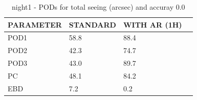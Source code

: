 \begin{table}[p!]
\begin{center}
\begin{tabular}{|l|l|l|l|}
\hline
\multicolumn{1}{|c|}{\cellcolor[HTML]{C0C0C0}\textbf{PARAMETER}} & \multicolumn{1}{c|}{\cellcolor[HTML]{C0C0C0}\textbf{STANDARD}} & \multicolumn{1}{c|}{\cellcolor[HTML]{C0C0C0}\textbf{WITH AR (1H)}} \\
\hline
\cellcolor[HTML]{C0C0C0}POD1  & 58.8                                & 88.4         \\
\cellcolor[HTML]{C0C0C0}POD2  & 42.3                                & 74.7         \\
\cellcolor[HTML]{C0C0C0}POD3  & 43.0                                & 89.7         \\
\cellcolor[HTML]{C0C0C0}PC    & 48.1                                  & 84.2           \\
\cellcolor[HTML]{C0C0C0}EBD   & 7.2                                 & 0.2          \\
\hline
\end{tabular}
\caption{night1 - PODs for total seeing (arcsec) and accuray 0.0}
\label{tab:podsee0.0:night1}
\end{center}
\end{table}

